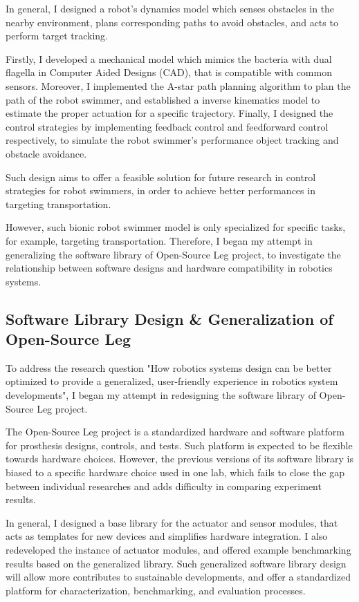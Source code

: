 \documentclass[8pt]{article}
\begin{document}
    In general, I designed a robot's dynamics model which senses obstacles in the nearby environment, plans corresponding paths to avoid obstacles, and acts to perform target tracking. 

    Firstly, I developed a mechanical model which mimics the bacteria with dual flagella in Computer Aided Designs (CAD), that is compatible with common sensors. Moreover, I implemented the A-star\cite{AstarAlgo} path planning algorithm to plan the path of the robot swimmer, and established a inverse kinematics model to estimate the proper actuation for a specific trajectory. Finally, I designed the control strategies by implementing feedback control and feedforward control respectively, to simulate the robot swimmer's performance object tracking and obstacle avoidance.

    Such design aims to offer a feasible solution for future research in control strategies for robot swimmers, in order to achieve better performances in targeting transportation. 
    
    However, such bionic robot swimmer model is only specialized for specific tasks, for example, targeting transportation. Therefore, I began my attempt in generalizing the software library of Open-Source Leg project, to investigate the relationship between software designs and hardware compatibility in robotics systems.

    \subsection{Software Library Design \& Generalization of Open-Source Leg}   \label{sec:OSL-Library}

    To address the research question "How robotics systems design can be better optimized to provide a generalized, user-friendly experience in robotics system developments", I began my attempt in redesigning the software library of Open-Source Leg project.
    
    The Open-Source Leg project is a standardized hardware and software platform for prosthesis designs, controls, and tests. Such platform is expected to be flexible towards hardware choices. However, the previous versions of its software library is biased to a specific hardware choice used in one lab, which fails to close the gap between individual researches and adds difficulty in comparing experiment results. 

    In general, I designed a base library for the actuator and sensor modules, that acts as templates for new devices and simplifies hardware integration. I also redeveloped the instance of actuator modules, and offered example benchmarking results based on the generalized library. Such generalized software library design will allow more contributes to sustainable developments, and offer a standardized platform for characterization, benchmarking, and evaluation processes. 
\end{document}
